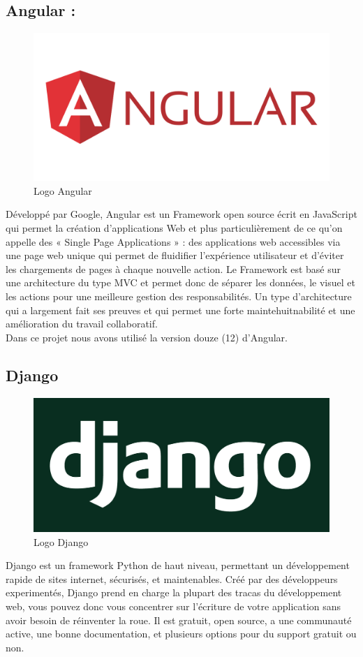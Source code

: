 \documentclass[a4paper, 12pt]{report}
\begin{document}
\subsection{Angular :}
\begin{figure}[H]
    \centering
    \includegraphics[width = 0.5\linewidth]{img/angular.png}
    \caption{Logo Angular}
\end{figure}
Développé par Google, Angular est un Framework open source écrit en JavaScript qui
permet la création d’applications Web et plus particulièrement de ce qu’on appelle des «
Single Page Applications » : des applications web accessibles via une page web unique qui
permet de fluidifier l’expérience utilisateur et d’éviter les chargements de pages à chaque
nouvelle action. Le Framework est basé sur une architecture du type MVC et permet donc de
séparer les données, le visuel et les actions pour une meilleure gestion des responsabilités. Un
type d’architecture qui a largement fait ses preuves et qui permet une forte maintehuitnabilité et
une amélioration du travail collaboratif.\\
Dans ce projet nous avons utilisé la version douze (12) d’Angular.\cite{angular}
\subsection{Django}
\begin{figure}[H]
    \centering
    \includegraphics[width = 0.5\linewidth]{img/django.png}
    \caption{Logo Django}
\end{figure}
Django est un framework Python de haut niveau, permettant un développement rapide de sites internet, sécurisés, et maintenables. Créé par des développeurs experimentés, Django prend en charge la plupart des tracas du développement web, vous pouvez donc vous concentrer sur l'écriture de votre application sans avoir besoin de réinventer la roue. Il est gratuit, open source, a une communauté active, une bonne documentation, et plusieurs options pour du support gratuit ou non.
\end{document}
